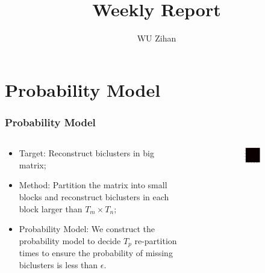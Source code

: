 \documentclass{beamer}
\title{Weekly Report}
\author{WU Zihan}
\begin{document}
\maketitle

\section{Probability Model}
\begin{frame}
    \frametitle{Probability Model}
    \begin{columns}
        \begin{column}{0.5\textwidth}

            \begin{itemize}
                \item Target: Reconstruct biclusters in big matrix;
                \item Method: Partition the matrix into small blocks and reconstruct biclusters in each block larger than $T_m \times T_n$;
                \item Probability Model: We construct the probability model to decide $T_p$ re-partition times to ensure the probability of missing biclusters is less than $\epsilon$.
            \end{itemize}
        \end{column}
        \begin{column}{0.5\textwidth}
            \vspace{-1cm}
            \centering
            \begin{figure}[htb]
                \centering
                \begin{subfigure}[b]{\textwidth}
                    \centering
                    \includegraphics[width=0.6\linewidth]{A.png}

\end{subfigure}
\end{figure}
\end{column}
\end{columns}
\end{frame}
\end{document}
